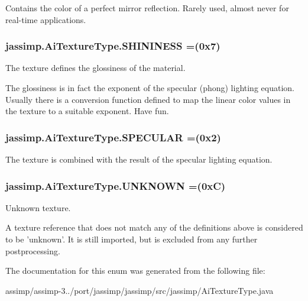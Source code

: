 Contains the color of a perfect mirror reflection. Rarely used, almost never for real-\/time applications. \hypertarget{enumjassimp_1_1_ai_texture_type_a99fdd3d7d88e306a282adb73b355910c}{
\subsubsection[{S\+H\+I\+N\+I\+N\+E\+S\+S}]{\setlength{\rightskip}{0pt plus 5cm}jassimp.\+Ai\+Texture\+Type.\+S\+H\+I\+N\+I\+N\+E\+S\+S =(0x7)}}\label{enumjassimp_1_1_ai_texture_type_a99fdd3d7d88e306a282adb73b355910c}
The texture defines the glossiness of the material.

The glossiness is in fact the exponent of the specular (phong) lighting equation. Usually there is a conversion function defined to map the linear color values in the texture to a suitable exponent. Have fun. \hypertarget{enumjassimp_1_1_ai_texture_type_a6e96964bdcdea35072b135cbe4cd8cc9}{
\subsubsection[{S\+P\+E\+C\+U\+L\+A\+R}]{\setlength{\rightskip}{0pt plus 5cm}jassimp.\+Ai\+Texture\+Type.\+S\+P\+E\+C\+U\+L\+A\+R =(0x2)}}\label{enumjassimp_1_1_ai_texture_type_a6e96964bdcdea35072b135cbe4cd8cc9}
The texture is combined with the result of the specular lighting equation. \hypertarget{enumjassimp_1_1_ai_texture_type_a641980192dc354719b10ebae097fccd1}{
\subsubsection[{U\+N\+K\+N\+O\+W\+N}]{\setlength{\rightskip}{0pt plus 5cm}jassimp.\+Ai\+Texture\+Type.\+U\+N\+K\+N\+O\+W\+N =(0x\+C)}}\label{enumjassimp_1_1_ai_texture_type_a641980192dc354719b10ebae097fccd1}
Unknown texture.

A texture reference that does not match any of the definitions above is considered to be 'unknown'. It is still imported, but is excluded from any further postprocessing. 

The documentation for this enum was generated from the following file\+:\begin{DoxyCompactItemize}
\item 
assimp/assimp-\/3../port/jassimp/jassimp/src/jassimp/Ai\+Texture\+Type.\+java\end{DoxyCompactItemize}
